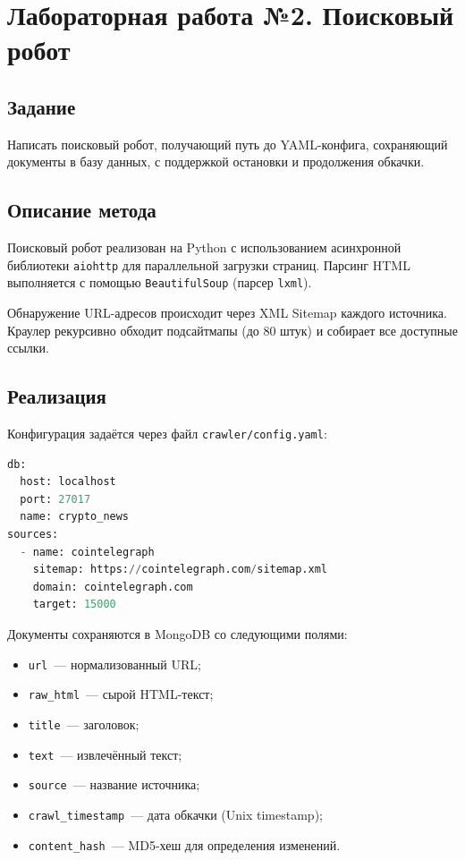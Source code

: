 \documentclass[12pt,a4paper]{article}
\begin{document}
\section{Лабораторная работа №2. Поисковый робот}

\subsection{Задание}
Написать поисковый робот, получающий путь до YAML-конфига, сохраняющий документы
в базу данных, с поддержкой остановки и продолжения обкачки.

\subsection{Описание метода}
Поисковый робот реализован на Python с использованием асинхронной библиотеки
\texttt{aiohttp} для параллельной загрузки страниц. Парсинг HTML выполняется
с помощью \texttt{BeautifulSoup} (парсер \texttt{lxml}).

Обнаружение URL-адресов происходит через XML Sitemap каждого источника.
Краулер рекурсивно обходит подсайтмапы (до 80 штук) и собирает все доступные ссылки.

\subsection{Реализация}
Конфигурация задаётся через файл \texttt{crawler/config.yaml}:

\begin{lstlisting}[language=Python]
db:
  host: localhost
  port: 27017
  name: crypto_news
sources:
  - name: cointelegraph
    sitemap: https://cointelegraph.com/sitemap.xml
    domain: cointelegraph.com
    target: 15000
\end{lstlisting}

Документы сохраняются в MongoDB со следующими полями:
\begin{itemize}
    \item \texttt{url}~--- нормализованный URL;
    \item \texttt{raw\_html}~--- сырой HTML-текст;
    \item \texttt{title}~--- заголовок;
    \item \texttt{text}~--- извлечённый текст;
    \item \texttt{source}~--- название источника;
    \item \texttt{crawl\_timestamp}~--- дата обкачки (Unix timestamp);
    \item \texttt{content\_hash}~--- MD5-хеш для определения изменений.
\end{itemize}
\end{document}
